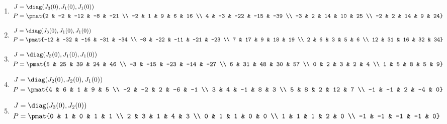 \begin{enumerate}
\item

\begin{align*}
J &= \diag(J_{3}(0), J_{1}(0), J_{1}(0))\\
P &= \pmat{2 & -2 & -12 & -8 & -21 \\ -2 & 1 & 9 & 6 & 16 \\ 4 & -3 & -22 & -15 & -39 \\ -3 & 2 & 14 & 10 & 25 \\ -2 & 2 & 14 & 9 & 24}
\end{align*}

\item

\begin{align*}
J &= \diag(J_{3}(0), J_{1}(0), J_{1}(0))\\
P &= \pmat{-12 & -32 & -16 & -31 & -34 \\ -8 & -22 & -11 & -21 & -23 \\ 7 & 17 & 9 & 18 & 19 \\ 2 & 6 & 3 & 5 & 6 \\ 12 & 31 & 16 & 32 & 34}
\end{align*}

\item

\begin{align*}
J &= \diag(J_{3}(0), J_{1}(0), J_{1}(0))\\
P &= \pmat{5 & 25 & 39 & 24 & 46 \\ -3 & -15 & -23 & -14 & -27 \\ 6 & 31 & 48 & 30 & 57 \\ 0 & 2 & 3 & 2 & 4 \\ 1 & 5 & 8 & 5 & 9}
\end{align*}

\item

\begin{align*}
J &= \diag(J_{2}(0), J_{2}(0), J_{1}(0))\\
P &= \pmat{4 & 6 & 1 & 9 & 5 \\ -2 & -2 & 2 & -6 & -1 \\ 3 & 4 & -1 & 8 & 3 \\ 5 & 8 & 2 & 12 & 7 \\ -1 & -1 & 2 & -4 & 0}
\end{align*}

\item

\begin{align*}
J &= \diag(J_{3}(0), J_{2}(0))\\
P &= \pmat{0 & 1 & 0 & 1 & 1 \\ 2 & 3 & 1 & 4 & 3 \\ 0 & 1 & 1 & 0 & 0 \\ 1 & 1 & 1 & 2 & 0 \\ -1 & -1 & -1 & -1 & 0}
\end{align*}


\end{enumerate}
